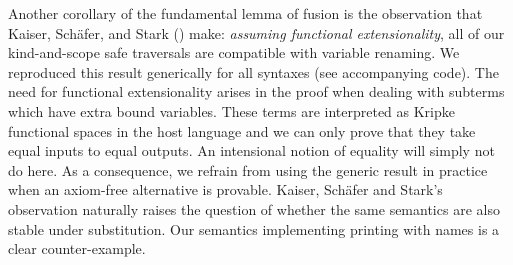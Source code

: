 Another corollary of the fundamental lemma of fusion is the observation that
Kaiser, Schäfer, and Stark (\citeyear{Kaiser-wsdebr}) make: \emph{assuming
functional extensionality}, all of our kind-and-scope safe traversals are
compatible with variable renaming.
%
We reproduced this result generically for all syntaxes (see accompanying code).
The need for functional extensionality arises in the proof when dealing with
subterms which have extra bound variables. These terms are interpreted as
Kripke functional spaces in the host language and we can only prove that they
take equal inputs to equal outputs. An intensional notion of equality will
simply not do here.
%
As a consequence, we refrain from using the generic result in practice when
an axiom-free alternative is provable. Kaiser, Schäfer and Stark's observation
naturally raises the question of whether the same semantics are also stable
under substitution. Our semantics implementing printing with names is a clear
counter-example.
